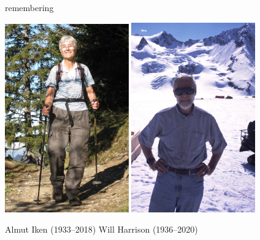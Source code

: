 \documentclass[10pt,hyperref,dvipsnames]{beamer}
\begin{document}
\begin{frame}{remembering}

\includegraphics[width=0.4\textwidth]{figs/Iken_front_crop.jpg} \hfill \includegraphics[width=0.4\textwidth]{figs/Will-by-Truffer.jpg}

Almut Iken (1933--2018) \hfill Will Harrison (1936--2020)
\end{frame}
\end{document}
